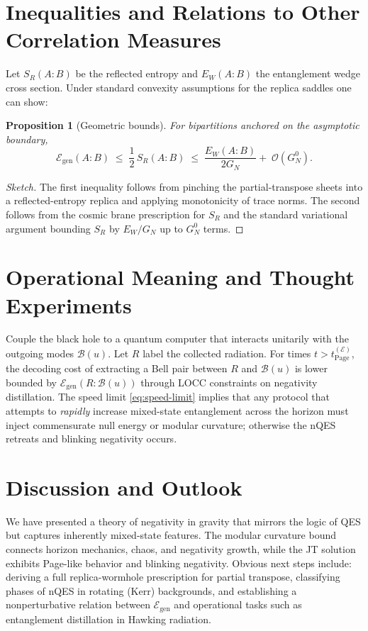 \documentclass[11pt]{article}
\newtheorem{proposition}{Proposition}
\newcommand{\B}{\mathcal{B}}
\newcommand{\E}{\mathcal{E}}
\begin{document}
\section{Inequalities and Relations to Other Correlation Measures}
Let $S_R(A:B)$ be the reflected entropy and $E_W(A:B)$ the entanglement wedge cross section.
Under standard convexity assumptions for the replica saddles one can show:
\begin{proposition}[Geometric bounds]
For bipartitions anchored on the asymptotic boundary,
\begin{equation}
  \E_{\mathrm{gen}}(A:B) \;\le\; \frac{1}{2}\, S_R(A:B) \;\le\; \frac{E_W(A:B)}{2G_N} +\;\mathcal{O}(G_N^0).
\end{equation}
\end{proposition}
\begin{proof}[Sketch]
The first inequality follows from pinching the partial-transpose sheets into a reflected-entropy replica and applying monotonicity of trace norms. The second follows from the cosmic brane prescription for $S_R$ and the standard variational argument bounding $S_R$ by $E_W/ G_N$ up to $G_N^0$ terms.
\end{proof}

\section{Operational Meaning and Thought Experiments}
Couple the black hole to a quantum computer that interacts unitarily with the outgoing modes $\B(u)$.
Let $R$ label the collected radiation. For times $t>t_{\mathrm{Page}}^{(\E)}$, the decoding cost of extracting a Bell pair between $R$ and $\B(u)$ is lower bounded by $\E_{\mathrm{gen}}(R:\B(u))$ through LOCC constraints on negativity distillation.
The speed limit \eqref{eq:speed-limit} implies that any protocol that attempts to \emph{rapidly} increase mixed-state entanglement across the horizon must inject commensurate null energy or modular curvature; otherwise the nQES retreats and blinking negativity occurs.

\section{Discussion and Outlook}
We have presented a theory of negativity in gravity that mirrors the logic of QES but captures inherently mixed-state features. The modular curvature bound connects horizon mechanics, chaos, and negativity growth, while the JT solution exhibits Page-like behavior and blinking negativity.
Obvious next steps include: deriving a full replica-wormhole prescription for partial transpose, classifying phases of nQES in rotating (Kerr) backgrounds, and establishing a nonperturbative relation between $\E_{\mathrm{gen}}$ and operational tasks such as entanglement distillation in Hawking radiation.
\end{document}
